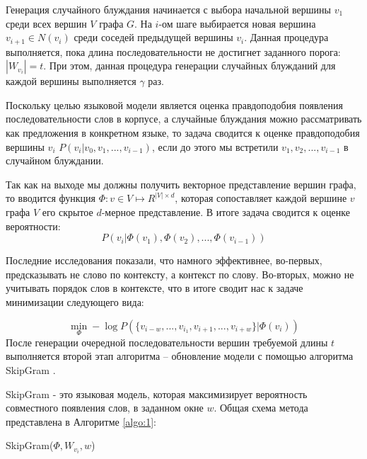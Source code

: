 Генерация случайного блуждания начинается с выбора начальной
вершины $v_1$ среди всех вершин $V$ графа $G$.  На $i$-ом шаге выбирается новая вершина $v_{i+1} \in N(v_i)$ среди соседей предыдущей вершины $v_i$. Данная процедура выполняется, пока длина последовательности
не достигнет заданного порога: $|W_{v_i}| = t$. При этом, данная процедура генерации случайных блужданий для каждой вершины выполняется $\gamma$ раз.

Поскольку целью языковой модели является оценка правдоподобия появления последовательности слов в корпусе, а случайные блуждания можно рассматривать как предложения в конкретном языке, то задача сводится к оценке правдоподобия вершины $v_i$ $P(v_i| v_0, v_1, ..., v_{i-1})$, если до этого мы встретили  $v_1, v_2, ..., v_{i-1}$ в случайном блуждании.

Так как на выходе мы должны получить векторное представление вершин графа, то вводится функция $\Phi: v \in V \mapsto R^{|V| \times d} $, которая сопоставляет каждой вершине $v$ графа $V$ его скрытое $d$-мерное представление. В итоге задача сводится к оценке вероятности:
$$P(v_i|\Phi(v_1), \Phi(v_2), ..., \Phi(v_{i-1}))$$



Последние исследования показали, что намного эффективнее, во-первых, предсказывать не слово по контексту, а контекст по слову.  Во-вторых, можно не учитывать порядок слов в контексте, что в итоге сводит нас к задаче минимизации следующего вида:

$$\min_{\Phi} -\log P(\{v_{i-w}, ..., v_{i_1}, v_{i+1}, ..., v_{i+w}\} | \Phi (v_i))$$
После генерации очередной последовательности вершин требуемой длины $t$ выполняется второй этап алгоритма -- обновление модели с помощью алгоритма SkipGram \cite{skipgram}. 

SkipGram - это языковая модель, которая максимизирует вероятность совместного появления слов, в заданном  окне $w$. Общая схема метода представлена в Алгоритме \ref{algo:1}:

\begin{algorithm}[H]

    \caption{SkipGram($\Phi, W_{v_i}, w$)}
    \label{algo:1}
\end{algorithm}

